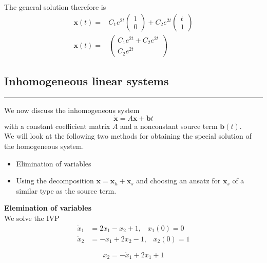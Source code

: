 The general solution therefore is
\begin{equation}
  \begin{split}
    \mathbf{x}(t) =& C_1 e^{2t} \begin{pmatrix} 1 \\ 0\end{pmatrix} +
    C_2 e^{2t} \begin{pmatrix} t \\ 1 \end{pmatrix}\\
    \mathbf{x}(t) =& \begin{pmatrix} C_1 e^{2t} + C_2 e^{2t}\\
    C_2 e^{2t} \end{pmatrix}
  \end{split}
\end{equation}



\subsection{Inhomogeneous linear systems}
\noindent\rule[\linienAbstand]{\linewidth}{\linienDicke}
We now discuss the inhomogeneous system
\begin{equation}
  \dot{\mathbf{x}} = A\mathbf{x} + \mathbf{b}t
\end{equation}
with a constant coefficient matrix $A$ and a nonconstant source term $\mathbf{b}(t)$.\\
We will look at the following two methods for obtaining the special solution of the homogeneous system.
\begin{itemize}
  \item Elimination of variables
  \item Using the decomposition $\mathbf{x} = \mathbf{x}_h + \mathbf{x}_s$ and choosing an ansatz for $\mathbf{x}_s$ of a similar type as the source term.
\end{itemize}

\textbf{Elemination of variables}\\
We solve the IVP
\begin{equation}
  \begin{split}
    \dot{x}_1 &= 2x_1 - x_2 + 1, \;\;\; x_1(0) = 0\\
    \dot{x}_2 &= -x_1 + 2x_2 - 1, \;\;\; x_2(0) = 1
  \end{split}
\end{equation}

\begin{equation}
  x_2 = -\dot{x}_1 + 2x_1 + 1
\end{equation}

